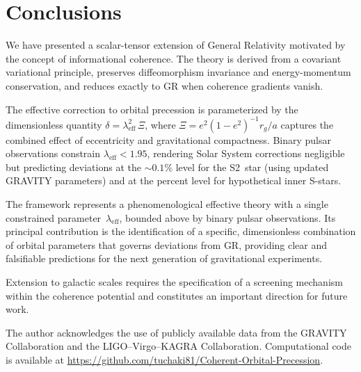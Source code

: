 \documentclass[showpacs,preprintnumbers,amsmath,amssymb,prd,longbibliography]{revtex4-2}
\begin{document}
\section{Conclusions}
\label{sec:conclusions}

We have presented a scalar-tensor extension of General Relativity
motivated by the concept of informational coherence.
The theory is derived from a covariant variational principle,
preserves diffeomorphism invariance and energy-momentum conservation,
and reduces exactly to GR when coherence gradients vanish.

The effective correction to orbital precession is parameterized
by the dimensionless quantity
$\delta = \lambda_{\mathrm{eff}}^2\,\Xi$,
where $\Xi = e^2(1-e^2)^{-1} r_g/a$ captures the combined
effect of eccentricity and gravitational compactness.
Binary pulsar observations constrain
$\lambda_{\mathrm{eff}} < 1.95$,
rendering Solar System corrections negligible but predicting
deviations at the $\sim 0.1\%$ level for the S2~star
(using updated GRAVITY parameters) and at the
percent level for hypothetical inner S-stars.

The framework represents a phenomenological effective theory
with a single constrained parameter~$\lambda_{\mathrm{eff}}$,
bounded above by binary pulsar observations.
Its principal contribution is the identification of a specific,
dimensionless combination of orbital parameters that governs
deviations from GR, providing clear and falsifiable predictions
for the next generation of gravitational experiments.

Extension to galactic scales requires the specification of
a screening mechanism within the coherence potential and
constitutes an important direction for future work.

\begin{acknowledgments}
The author acknowledges the use of publicly available data from
the GRAVITY Collaboration and the
LIGO--Virgo--KAGRA Collaboration.
Computational code is available at
\url{https://github.com/tuchaki81/Coherent-Orbital-Precession}.
\end{acknowledgments}



\end{document}

